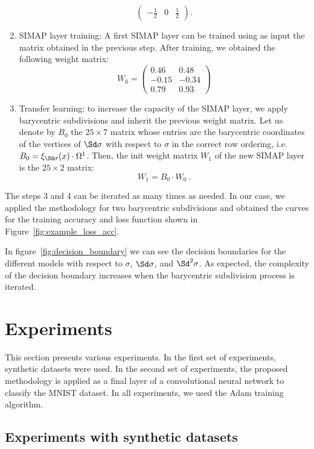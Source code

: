 \begin{example}
\begin{enumerate}
\[\begin{pmatrix}
-\frac{1}{2} & 0 & \frac{1}{2} 
\end{pmatrix}.
\]
\item SIMAP layer training: A first SIMAP layer can be trained using as input the matrix obtained in the previous step. After training, we obtained the following weight
matrix: 
$$
W_0=\begin{pmatrix}
0.46 & 0.48 \\
-0.15 & -0.34 \\
0.79 & 0.93 
\end{pmatrix}$$
\item Transfer learning:  to increase the capacity of the SIMAP layer, we  apply barycentric subdivisions and inherit the previous weight matrix.
Let us denote by $B_0$ the 
$25\times 7$ matrix whose entries are the barycentric coordinates of the vertices of $\Sd \sigma$ with respect to $\sigma$ in the correct row ordering, i.e. $B_0=\xi_{\Sd \sigma}(x)
\cdot \Omega^1$. Then, the init weight matrix 
$W_1$ of the new SIMAP layer is the
$25\times 2$ matrix:
$$W_1=B_0\cdot W_0\,.$$
\end{enumerate}

The steps 3 and 4 can be iterated as many times as needed.
In our case, we applied the methodology for two barycentric subdivisions and obtained the curves for the training accuracy and loss function shown in Figure~\ref{fig:example_loss_acc}.



In figure~\ref{fig:decision_boundary} we can see the decision boundaries for the different models with respect to $\sigma$, $\Sd \sigma$, and $\Sd^2 \sigma$. As expected, the complexity of the decision boundary increases when the barycentric subdivision process is
iterated. 
\end{example}



\section{Experiments}\label{sec:exper}
This section presents various experiments. In the first set of experiments, synthetic datasets were
used.
In the second set of experiments, the proposed methodology is applied as a final layer of a convolutional neural network to classify the MNIST dataset. In all experiments, we used the Adam \cite{DBLP:journals/corr/KingmaB14} training algorithm. 

\subsection{Experiments with synthetic datasets}\label{sec:synthetic_exp}

